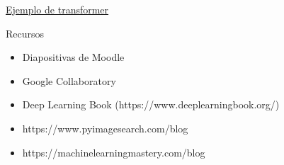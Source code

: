 \begin{exercise}
\href{https://colab.research.google.com/drive/1dIKI6xl_Wi5XycbSgYF9qJDYWBsvvTrH}{Ejemplo de transformer}
\end{exercise}


\begin{frame}{Recursos}
\begin{itemize}
    \item Diapositivas de Moodle
    \item Google Collaboratory
    \item Deep Learning Book (https://www.deeplearningbook.org/)
    \item https://www.pyimagesearch.com/blog
    \item https://machinelearningmastery.com/blog
\end{itemize}
\end{frame}






\appendix

%     
%     

